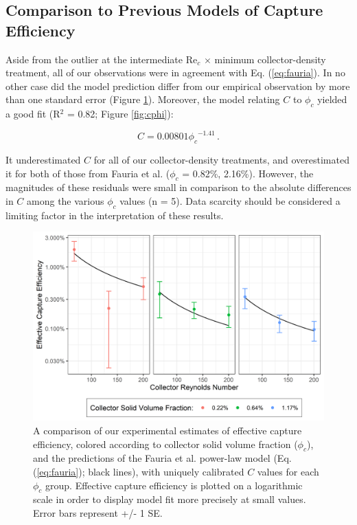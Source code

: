 \documentclass[geosciences,article,submit,moreauthors,pdftex]{Definitions/mdpi}
\newcommand\Rey{\mathrm{Re}}
\begin{document}
\subsection{Comparison to Previous Models of Capture Efficiency}

Aside from the outlier at the intermediate $\Rey_c$ $\times$ minimum collector-density treatment, all of our observations were in agreement with Eq. (\ref{eq:fauria}). In no other case did the model prediction differ from our empirical observation by more than one standard error (Figure \ref{fig:compplot}). Moreover, the model relating $C$ to $\phi_c$ yielded a good fit (R$^2$ = 0.82; Figure \ref{fig:cphi}):

\begin{equation}
    C = 0.00801{\phi_c}^{-1.41}\,.
    \label{eq:cphi}
\end{equation}

\noindent It underestimated $C$ for all of our collector-density treatments, and overestimated it for both of those from Fauria et al. ($\phi_c$ = 0.82\%, 2.16\%). However, the magnitudes of these residuals were small in comparison to the absolute differences in $C$ among the various $\phi_c$ values (n = 5). Data scarcity should be considered a limiting factor in the interpretation of these results.

\begin{figure}[H]
\centering
\includegraphics[width=5in]{../pics/comparisonplot.png}
\caption{A comparison of our experimental estimates of effective capture efficiency, colored according to collector solid volume fraction ($\phi_c$), and the predictions of the Fauria et al. \cite{Fauria_2015} power-law model (Eq. (\ref{eq:fauria}); black lines), with uniquely calibrated $C$ values for each $\phi_c$ group. Effective capture efficiency is plotted on a logarithmic scale in order to display model fit more precisely at small values. Error bars represent +/- 1 SE.}
\label{fig:compplot}
\end{figure}   
\end{document}
